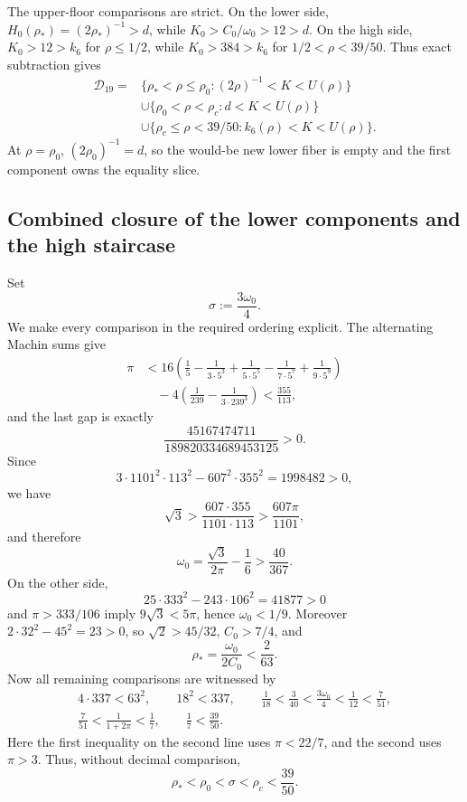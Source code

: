 \documentclass[11pt]{article}
\numberwithin{equation}{section}
\theoremstyle{definition}
\theoremstyle{remark}
\begin{document}
The upper-floor comparisons are strict.  On the lower side,
\(H_0(\rho_*)=(2\rho_*)^{-1}>d\), while
\(K_0>C_0/\omega_0>12>d\).  On the high side, \(K_0>12>k_6\) for
\(\rho\leq1/2\), while \(K_0>384>k_6\) for
\(1/2<\rho<39/50\).  Thus exact subtraction gives
\begin{equation}
\boxed{\begin{aligned}
\mathcal D_{19}={}&
\{\rho_*<\rho\leq\rho_0:(2\rho)^{-1}<K<U(\rho)\}\\
&\cup\{\rho_0<\rho<\rho_c:d<K<U(\rho)\}\\
&\cup\{\rho_c\leq\rho<39/50:k_6(\rho)<K<U(\rho)\}.
\end{aligned}}
\label{cm:eq-D19}
\end{equation}
At \(\rho=\rho_0\), \((2\rho_0)^{-1}=d\), so the would-be new lower
fiber is empty and the first component owns the equality slice.

\subsection{Combined closure of the lower components and the high staircase}

Set
\[
 \sigma:=\frac{3\omega_0}{4}.
\]
We make every comparison in the required ordering explicit.  The
alternating Machin sums give
\[
\begin{aligned}
 \pi
 &<16\left(\frac15-\frac1{3\cdot5^3}
 +\frac1{5\cdot5^5}-\frac1{7\cdot5^7}
 +\frac1{9\cdot5^9}\right)\\
 &\quad-4\left(\frac1{239}-\frac1{3\cdot239^3}\right)
 <\frac{355}{113},
\end{aligned}
\]
and the last gap is exactly
\[
 \frac{45167474711}{189820334689453125}>0.
\]
Since
\[
 3\cdot1101^2\cdot113^2-607^2\cdot355^2=1998482>0,
\]
we have
\[
 \sqrt3>\frac{607\cdot355}{1101\cdot113}
 >\frac{607\pi}{1101},
\]
and therefore
\begin{equation}
 \omega_0=\frac{\sqrt3}{2\pi}-\frac16>\frac{40}{367}.
 \label{cm:eq-omega-lower}
\end{equation}
On the other side,
\[
 25\cdot333^2-243\cdot106^2=41877>0
\]
and \(\pi>333/106\) imply \(9\sqrt3<5\pi\), hence
\(\omega_0<1/9\).  Moreover
\(2\cdot32^2-45^2=23>0\), so
\(\sqrt2>45/32\), \(C_0>7/4\), and
\[
 \rho_*=\frac{\omega_0}{2C_0}<\frac2{63}.
\]
Now all remaining comparisons are witnessed by
\[
\begin{gathered}
 4\cdot337<63^2,\qquad 18^2<337,\qquad
 \frac1{18}<\frac3{40}<\frac{3\omega_0}{4}
 <\frac1{12}<\frac7{51},\\
 \frac7{51}<\frac1{1+2\pi}<\frac17,\qquad
 \frac17<\frac{39}{50}.
\end{gathered}
\]
Here the first inequality on the second line uses \(\pi<22/7\), and the
second uses \(\pi>3\).  Thus, without decimal comparison,
\[
 \rho_*<\rho_0<\sigma<\rho_c<\frac{39}{50}.
\]
\end{document}
